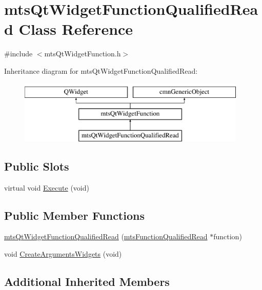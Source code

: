 \hypertarget{classmts_qt_widget_function_qualified_read}{\section{mts\-Qt\-Widget\-Function\-Qualified\-Read Class Reference}
\label{classmts_qt_widget_function_qualified_read}
}


{\ttfamily \#include $<$mts\-Qt\-Widget\-Function.\-h$>$}

Inheritance diagram for mts\-Qt\-Widget\-Function\-Qualified\-Read\-:\begin{figure}[H]
\begin{center}
\leavevmode
\includegraphics[height=3.000000cm]{dc/da7/classmts_qt_widget_function_qualified_read}
\end{center}
\end{figure}
\subsection*{Public Slots}
\begin{DoxyCompactItemize}
\item 
virtual void \hyperlink{classmts_qt_widget_function_qualified_read_ac127b467c859d1272a7c45f9d3a83ca3}{Execute} (void)
\end{DoxyCompactItemize}
\subsection*{Public Member Functions}
\begin{DoxyCompactItemize}
\item 
\hyperlink{classmts_qt_widget_function_qualified_read_af9671731059bdac11d0fd0acb911fb97}{mts\-Qt\-Widget\-Function\-Qualified\-Read} (\hyperlink{classmts_function_qualified_read}{mts\-Function\-Qualified\-Read} $\ast$function)
\item 
void \hyperlink{classmts_qt_widget_function_qualified_read_a1c7d546a6894bcb7f19243e416178e49}{Create\-Arguments\-Widgets} (void)
\end{DoxyCompactItemize}
\subsection*{Additional Inherited Members}


